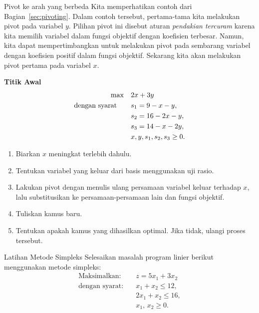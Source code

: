 \begin{ex}{Pivot ke arah yang berbeda}{}
\label{ex:alternative-pivot}
 Kita memperhatikan contoh dari Bagian~\ref{sec:pivoting}. Dalam contoh tersebut, pertama-tama kita melakukan pivot pada variabel $y$. Pilihan pivot ini disebut aturan \emph{pendakian tercuram} karena kita memilih variabel dalam fungsi objektif dengan koefisien terbesar.  
Namun, kita dapat mempertimbangkan untuk melakukan pivot pada sembarang variabel dengan koefisien positif dalam fungsi objektif. Sekarang kita akan melakukan pivot pertama pada variabel $x$.  

\textbf{Titik Awal}
\[
\begin{aligned}
\max\quad &  2x + 3y \\
\mbox{dengan syarat}\quad\quad & s_1 = 9 - x - y, \\
                        & s_2 = 16 - 2x - y, \\
                        & s_3 = 14 - x - 2y, \\
                        & x, y, s_1, s_2, s_3 \ge 0.
\end{aligned}
\]

\begin{enumerate}
    \item Biarkan \(x\) meningkat terlebih dahulu.
    \item Tentukan variabel yang keluar dari basis menggunakan uji rasio.
    \item Lakukan pivot dengan menulis ulang persamaan variabel keluar terhadap \(x\), lalu substitusikan ke persamaan-persamaan lain dan fungsi objektif.
    \item Tuliskan kamus baru.
    \item Tentukan apakah kamus yang dihasilkan optimal. Jika tidak, ulangi proses tersebut.
\end{enumerate}
\exrefs{\S\ref{sec:pivoting}; \S\ref{sec:simplex-algorithm}}
\end{ex}

\begin{ex}{Latihan Metode Simpleks}{}
\label{ex:simplex-practice-5-3}
 Selesaikan masalah program linier berikut menggunakan metode simpleks:
\[
\begin{aligned}
\text{Maksimalkan:}\quad & z = 5x_{1} + 3x_{2}\\
\text{dengan syarat:}\quad & x_{1} + x_{2} \le 12,\\
& 2x_{1} + x_{2} \le 16,\\
& x_{1},\, x_{2} \ge 0.
\end{aligned}
\]
\exrefs{\S\ref{sec:pivoting}; \S\ref{sec:simplex-algorithm}}
\end{ex}

